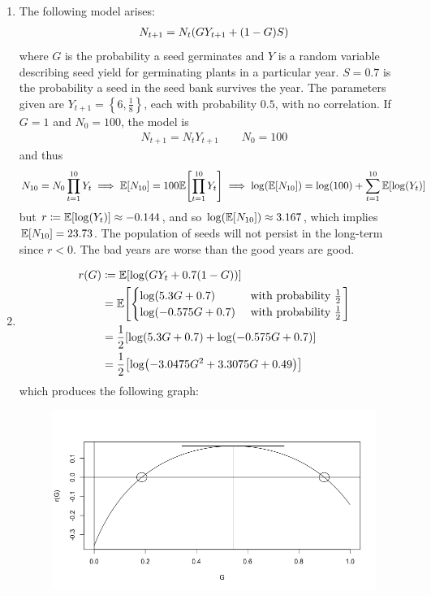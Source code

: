 \documentclass{article} %
\theoremstyle{plain}
\newcommand{\expec}[1]{\mathbb{E}\qty[#1]}
\numberwithin{equation}{section} %
\numberwithin{figure}{section} %
\numberwithin{table}{section} %
\begin{document}
\begin{enumerate}[\ \ (a)]
    \item
        The following model arises:
        \begin{align*}
            N_{t+1} = N_t\qty(GY_{t+1} + (1 - G)S)
        \end{align*}
        where $G$ is the probability a seed germinates and $Y$ is a random variable describing seed yield for germinating plants in a particular year.  $S = 0.7$ is the probability a seed in the seed bank survives the year.  The parameters given are $Y_{t+1} = \left\{6,\frac{1}{8}\right\}$, each with probability $0.5$, with no correlation.  If $G = 1$ and $N_0 = 100$, the model is 
        \begin{align*}
            N_{t+1} = N_tY_{t+1} \qquad N_0 = 100
        \end{align*}
        and thus
        \begin{align*}
            N_{10} = N_0\prod_{t=1}^{10}Y_{t} \implies \expec{N_{10}} = 100\expec{\prod_{t=1}^{10}Y_t} \implies \log(\expec{N_{10}}) = \log(100) + \sum_{t=1}^{10}\expec{\log(Y_t)}
        \end{align*}
        but $r \coloneqq \expec{\log(Y_t)} \approx -0.144$, and so $\log(\expec{N_{10}}) \approx 3.167$, which implies $\expec{N_{10}} = 23.73$.  The population of seeds will not persist in the long-term since $r < 0$.  The bad years are worse than the good years are good.
    \item
        \begin{align*}
            r(G) &\coloneqq \expec{\log(GY_{t} + 0.7(1 - G))} \\
            &= \expec{\begin{cases}
                \log(5.3G + 0.7) & \text{ with probability } \frac{1}{2} \\
                \log(-0.575G + 0.7) & \text{ with probability } \frac{1}{2}
            \end{cases}} \\
            &= \frac{1}{2}\qty[\log(5.3G + 0.7) + \log(-0.575G + 0.7)] \\
            &= \frac{1}{2}\qty[\log(-3.0475G^2 + 3.3075G + 0.49)]
        \end{align*}
        which produces the following graph:
        \begin{figure}[ht!]
            \centering
            \includegraphics[scale=0.5]{figure_1b.png}

\end{figure}
\end{enumerate}
\end{document}
